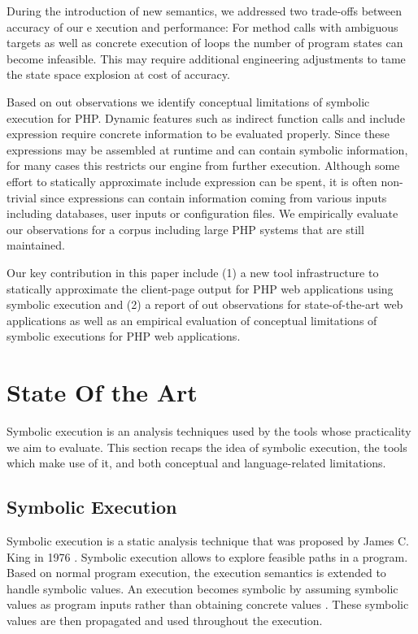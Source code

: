 \documentclass[sigconf]{acmart}
\begin{document}
During the introduction of new semantics, we addressed two  trade-offs between
accuracy of our e xecution and performance: For method calls with ambiguous
targets as well as concrete execution of loops the number of program states can
become infeasible. This may require additional engineering adjustments to tame
the state space explosion at cost of accuracy.

Based on out observations we identify conceptual limitations of symbolic
execution for PHP.  Dynamic features such as indirect function calls and
include expression require concrete information to be evaluated properly. Since
these expressions may be assembled at runtime and can contain symbolic
information, for many cases this restricts our engine from further execution.
Although some effort to statically approximate include expression can be spent,
it is often non-trivial since expressions can contain information coming from
various inputs including databases, user inputs or configuration files. We
empirically evaluate our observations for a corpus including large PHP systems that are still maintained.

Our key contribution in this paper include (1)  a new tool infrastructure to
statically approximate the client-page output for PHP web applications using
symbolic execution and (2) a report of out observations for state-of-the-art
web applications as well as an empirical evaluation of conceptual limitations
of symbolic executions for PHP web applications.

\section{State Of the Art}\label{sec:stateoftheart}
Symbolic execution is an analysis techniques used by the tools
whose practicality we aim to evaluate. This section recaps the idea of symbolic
execution, the tools which make use of it, and both conceptual and
language-related limitations.

\subsection{Symbolic Execution}
Symbolic execution is a static analysis technique that was proposed by James C.
King in 1976 \cite{King1976}. Symbolic execution allows to explore feasible
paths in a program. Based on normal program execution, the execution semantics
is extended to handle symbolic values. An execution becomes symbolic by
assuming symbolic values as program inputs rather than obtaining concrete
values \cite{King1976,Darringer1978}. These symbolic values are then propagated
and used throughout the execution. 
\end{document}
